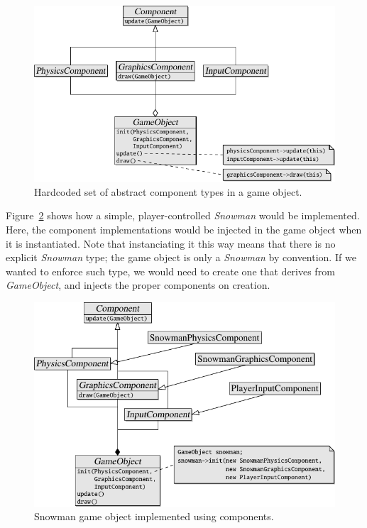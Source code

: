\documentclass[
    phd,
    electronic,
    letterpaper,
    simplechapterheading,
    openany,
    parttop,
    lof,
]{byumsphd}
\begin{document}
\begin{figure}[H]
\bigskip
\centering
\includegraphics[width=\linewidth]{hierarchy-uml-diagrams/component-1.pdf}
\caption{Hardcoded set of abstract component types in a game object.}
\label{fig:component:1}
\end{figure}

Figure~\ref{fig:component:2} shows how a simple, player-controlled \textit{Snowman} would be implemented. Here, the component implementations would be injected in the game object when it is instantiated. Note that instanciating it this way means that there is no explicit \textit{Snowman} type; the game object is only a \textit{Snowman} by convention. If we wanted to enforce such type, we would need to create one that derives from \textit{GameObject}, and injects the proper components on creation.

\begin{figure}[H]
\bigskip
\centering
\includegraphics[width=\linewidth]{hierarchy-uml-diagrams/component-2.pdf}
\caption{Snowman game object implemented using components.}
\label{fig:component:2}
\end{figure}
\end{document}
